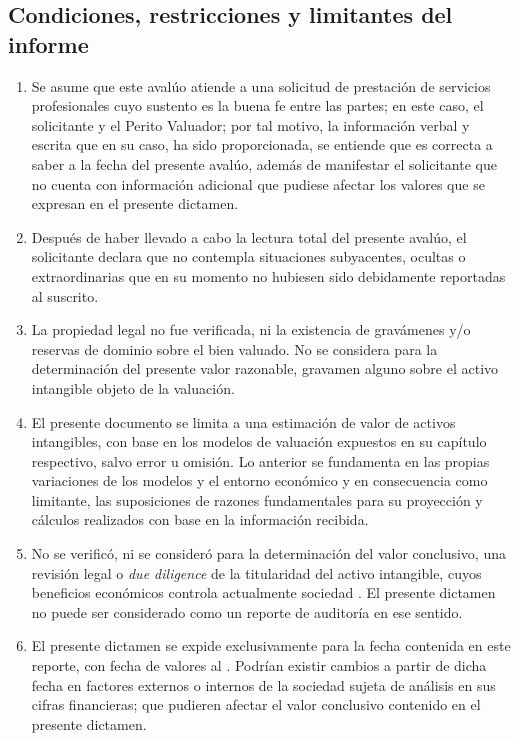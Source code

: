\subsection{Condiciones, restricciones y limitantes del informe}

\begin{enumerate}[\indent a)]
\item Se asume que este avalúo atiende a una solicitud de prestación de servicios profesionales cuyo sustento es la buena fe entre las partes; en este caso, el solicitante y el Perito Valuador; por tal motivo, la información verbal y escrita que en su caso, ha sido proporcionada, se entiende que es correcta a saber a la fecha del presente avalúo, además de manifestar el solicitante que no cuenta con información adicional  que pudiese afectar los valores que se expresan en el presente dictamen.

\item Después de haber llevado a cabo la lectura total del presente avalúo, el solicitante declara que no contempla situaciones subyacentes, ocultas o extraordinarias que en su momento no hubiesen sido debidamente reportadas al suscrito.

\item La propiedad legal no fue verificada, ni la existencia de gravámenes y/o reservas de dominio sobre el bien valuado. No se considera para la determinación del presente valor razonable, gravamen alguno sobre el activo intangible objeto de la valuación.

\item El presente documento se limita a una estimación de valor de activos intangibles, con base en los modelos de valuación expuestos en su capítulo respectivo, salvo error u omisión. Lo anterior se fundamenta en las propias variaciones de los modelos y el entorno económico y en consecuencia como limitante, las suposiciones de razones fundamentales para su proyección y cálculos realizados con base en la información recibida.

\item No se verificó, ni se consideró para la determinación del valor conclusivo, una revisión legal o \textit{due diligence} de la titularidad del activo intangible, cuyos beneficios económicos controla actualmente sociedad \textcolor{principal}{\empresaSolicitante.} El presente dictamen no puede ser considerado como un reporte de auditoría en ese sentido. 

\item El presente dictamen se expide exclusivamente para la fecha contenida en este reporte, con fecha de valores  al \textcolor{principal}{\fechaValores}. Podrían existir cambios a partir de dicha fecha en factores externos o internos de la sociedad sujeta de análisis en sus cifras financieras; que pudieren afectar el valor conclusivo contenido en el presente dictamen.


\end{enumerate}
